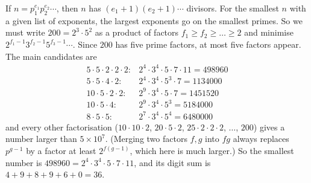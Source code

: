 If $n=p_1^{e_1}p_2^{e_2}\cdots$, then $n$ has $(e_1+1)(e_2+1)\cdots$ divisors. For the smallest $n$ with a given list of exponents, the largest exponents go on the smallest primes. So we must write $200=2^3\cdot5^2$ as a product of factors $f_1\ge f_2\ge\dots\ge2$ and minimise $2^{f_1-1}3^{f_2-1}5^{f_3-1}\cdots$. Since $200$ has five prime factors, at most five factors appear. The main candidates are
\[
\begin{array}{ll}
5\cdot5\cdot2\cdot2\cdot2: & 2^4\cdot3^4\cdot5\cdot7\cdot11=498960\\
5\cdot5\cdot4\cdot2: & 2^4\cdot3^4\cdot5^3\cdot7=1134000\\
10\cdot5\cdot2\cdot2: & 2^9\cdot3^4\cdot5\cdot7=1451520\\
10\cdot5\cdot4: & 2^9\cdot3^4\cdot5^3=5184000\\
8\cdot5\cdot5: & 2^7\cdot3^4\cdot5^4=6480000
\end{array}
\]
and every other factorisation ($10\cdot10\cdot2$, $20\cdot5\cdot2$, $25\cdot2\cdot2\cdot2$, $\dots$, $200$) gives a number larger than $5\times10^7$. (Merging two factors $f,g$ into $fg$ always replaces $p^{g-1}$ by a factor at least $2^{f(g-1)}$, which here is much larger.) So the smallest number is $498960=2^4\cdot3^4\cdot5\cdot7\cdot11$, and its digit sum is $4+9+8+9+6+0=\boxed{36}$.

